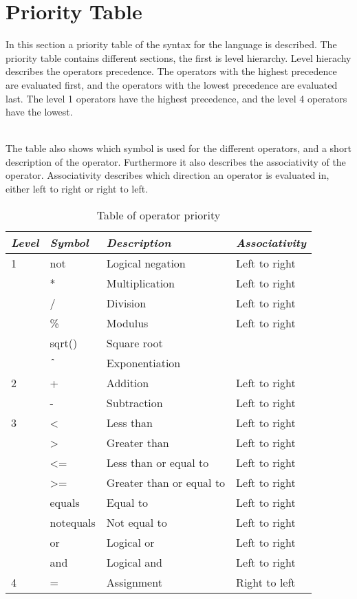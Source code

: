 \section{Priority Table}
In this section a priority table of the syntax for the language is described. The priority table contains different sections, the first is level hierarchy. Level hierachy describes the operators precedence. The operators with the highest precedence are evaluated first, and the operators with the lowest precedence are evaluated last. The level 1 operators have the highest precedence, and the level 4 operators have the lowest.
 
\\The table also shows which symbol is used for the different operators, and a short description of the operator. Furthermore it also describes the associativity of the operator. Associativity describes which direction an operator is evaluated in, either left to right or right to left.

\begin{table}[H]
	\center
	\begin{tabular}{|l|l|l|l|}
	\hline
	\emph{Level} & \emph{Symbol} & \emph{Description} & \emph{Associativity} \\ 
 		\hline
 		1 & not & Logical negation & Left to right \\
 		& * & Multiplication & Left to right\\
 		& / & Division & Left to right\\
 		& \% & Modulus & Left to right\\
 		& sqrt() & Square root & \\
 		& $\texttt{\^{}}$ & Exponentiation &\\
 		\hline
 		2 & + & Addition & Left to right \\
 		& - & Subtraction & Left to right\\
 		\hline
 		3 & <  & Less than & Left to right \\
 		& > & Greater than & Left to right \\
 		& <= & Less than or equal to & Left to right \\
 		& >= & Greater than or equal to & Left to right \\
 		& equals & Equal to & Left to right \\
 		& notequals & Not equal to & Left to right \\
 		& or & Logical or & Left to right \\
 		& and & Logical and & Left to right\\
 		\hline
 		4 & = & Assignment & Right to left \\
 		\hline
	\end{tabular}
	\label{tab:priority}
	\caption{Table of operator priority}
\end{table} 

